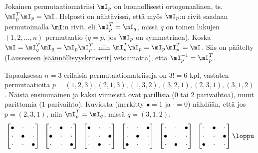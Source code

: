 Jokainen permutaatiomatriisi $\mI_p$ on luonnollisesti ortogonaalinen, ts.\ $\mI_p^T\mI_p=\mI$.
Helposti on nähtävissä, että myös $\mI_p$:n rivit saadaan permutoimalla $\mI$:n rivit, eli
$\mI_p^T=\mI_q$, missä $q$ on toinen lukujen $(1,2,\ldots,n)$ permutaatio ($q=p$, jos $\mI_p$ on
symmetrinen). Koska $\mI=\mI_q^T\mI_q=\mI_p\mI_p^T$, niin $\mI_p^T\mI_p=\mI_p\mI_p^T=\mI$. Siis
on päätelty (Lauseeseen \ref{säännöllisyyskriteerit} vetoamatta), että $\mI_p^{-1}=\mI_p^T$.
\begin{Exa} Tapauksessa $n=3$ erilaisia permutaatiomatriiseja on $3!=6$ kpl, vastaten
permutaatioita $p=(1,2,3),(2,1,3),(1,3,2),(3,2,1),(2,3,1),(3,1,2)$. Näistä ensimmäinen ja
kaksi viimeistä ovat parillisia ($0$ tai $2$ parivaihtoa), muut parittomia ($1$ parivaihto).
Kuviosta (merkitty $\bullet=1$ ja $\cdot=0$) nähdään, että jos $p=(2,3,1)$, niin
$\mI_p^T=\mI_q$, missä $q=(3,1,2)$.
\[
\begin{bmatrix}
\bullet & \cdot & \cdot \\ 
\cdot & \bullet & \cdot \\
\cdot & \cdot & \bullet
\end{bmatrix}\,\ 
\begin{bmatrix}
\cdot & \bullet & \cdot \\ 
\bullet & \cdot & \cdot  \\
\cdot & \cdot & \bullet
\end{bmatrix}\,\
\begin{bmatrix}
\bullet & \cdot & \cdot \\ 
\cdot & \cdot & \bullet \\
\cdot & \bullet & \cdot
\end{bmatrix}\,\
\begin{bmatrix}
\cdot & \cdot & \bullet \\ 
\cdot & \bullet & \cdot \\
\bullet & \cdot & \cdot
\end{bmatrix}\,\
\begin{bmatrix}
\cdot & \cdot & \bullet \\ 
\bullet & \cdot & \cdot  \\
\cdot & \bullet & \cdot
\end{bmatrix}\,\
\begin{bmatrix}
\cdot & \bullet & \cdot \\ 
\cdot & \cdot & \bullet \\
\bullet & \cdot & \cdot
\end{bmatrix} \loppu
\]
\end{Exa}


